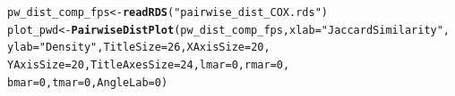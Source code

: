 \documentclass[twoside,a4wide,12pt]{article}\usepackage[]{graphicx}\usepackage[]{color}
\makeatletter
\newcommand{\hlnum}[1]{\textcolor[rgb]{0.686,0.059,0.569}{#1}}%
\newcommand{\hlstr}[1]{\textcolor[rgb]{0.192,0.494,0.8}{#1}}%
\newcommand{\hlstd}[1]{\textcolor[rgb]{0.345,0.345,0.345}{#1}}%
\newcommand{\hlkwb}[1]{\textcolor[rgb]{0.69,0.353,0.396}{#1}}%
\newcommand{\hlkwc}[1]{\textcolor[rgb]{0.333,0.667,0.333}{#1}}%
\newcommand{\hlkwd}[1]{\textcolor[rgb]{0.737,0.353,0.396}{\textbf{#1}}}%
\newenvironment{kframe}{%
 \def\at@end@of@kframe{}%
 \ifinner\ifhmode%
  \def\at@end@of@kframe{\end{minipage}}%
  \begin{minipage}{\columnwidth}%
 \fi\fi%
 \def\FrameCommand##1{\hskip\@totalleftmargin \hskip-\fboxsep
 \colorbox{shadecolor}{##1}\hskip-\fboxsep
     \hskip-\linewidth \hskip-\@totalleftmargin \hskip\columnwidth}%
 \MakeFramed {\advance\hsize-\width
   \@totalleftmargin\z@ \linewidth\hsize
   \@setminipage}}%
 {\par\unskip\endMakeFramed%
 \at@end@of@kframe}
\newenvironment{knitrout}{}{} %
\makeatother
\begin{document}
\begin{knitrout}
\color{fgcolor}\begin{kframe}
\begin{alltt}
\hlstd{pw_dist_comp_fps} \hlkwb{<-} \hlkwd{readRDS}\hlstd{(}\hlstr{"pairwise_dist_COX.rds"}\hlstd{)}
\hlstd{plot_pwd} \hlkwb{<-} \hlkwd{PairwiseDistPlot}\hlstd{(pw_dist_comp_fps,} \hlkwc{xlab} \hlstd{=} \hlstr{"Jaccard Similarity"}\hlstd{,}
    \hlkwc{ylab} \hlstd{=} \hlstr{"Density"}\hlstd{,} \hlkwc{TitleSize} \hlstd{=} \hlnum{26}\hlstd{,} \hlkwc{XAxisSize} \hlstd{=} \hlnum{20}\hlstd{,}
    \hlkwc{YAxisSize} \hlstd{=} \hlnum{20}\hlstd{,} \hlkwc{TitleAxesSize} \hlstd{=} \hlnum{24}\hlstd{,} \hlkwc{lmar} \hlstd{=} \hlnum{0}\hlstd{,} \hlkwc{rmar} \hlstd{=} \hlnum{0}\hlstd{,}
    \hlkwc{bmar} \hlstd{=} \hlnum{0}\hlstd{,} \hlkwc{tmar} \hlstd{=} \hlnum{0}\hlstd{,} \hlkwc{AngleLab} \hlstd{=} \hlnum{0}\hlstd{)}
\end{alltt}
\end{kframe}
\end{knitrout}
\end{document}
